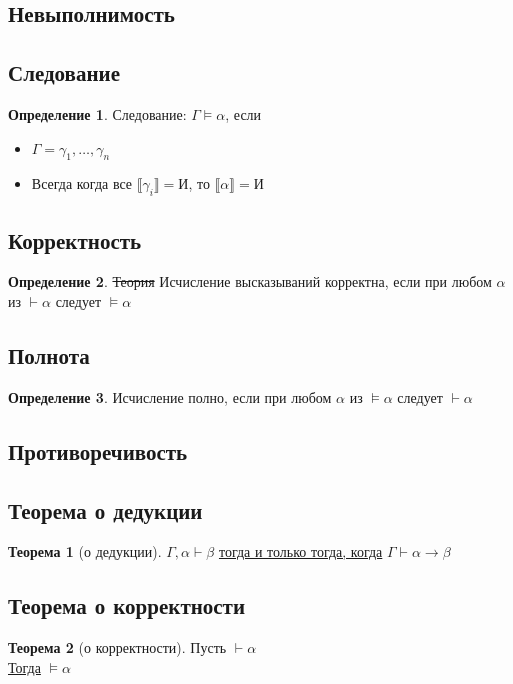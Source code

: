 \documentclass[english]{article}
\newcommand{\llb}{\llbracket}
\newcommand{\rrb}{\rrbracket}
\theoremstyle{plain}
\theoremstyle{remark}
\theoremstyle{definition}
\newtheorem{theorem}{Теорема}[section]
\newtheorem*{definition}{Определение}
\begin{document}
\subsection{Невыполнимость}
\label{sec:org86ad789}
\subsection{Следование}
\label{sec:orgda2d22a}
\begin{definition}
Следование: \(\Gamma \vDash \alpha\), если
\begin{itemize}
\item \(\Gamma = \gamma_1, \dots, \gamma_n\)
\item Всегда когда все \(\llb \gamma_i \rrb = \text{И}\), то \(\llb \alpha \rrb = \text{И}\)
\end{itemize}
\label{org0cebb48}
\end{definition}
\subsection{Корректность}
\label{sec:orgf7c87ea}
\begin{definition}
\sout{Теория} Исчисление высказываний корректна, если при любом \(\alpha\) из \(\vdash \alpha\) следует \(\vDash \alpha\)
\label{orge2f8871}
\end{definition}
\subsection{Полнота}
\label{sec:orgcb2dcf9}
\begin{definition}
Исчисление полно, если при любом \(\alpha\) из \(\vDash \alpha\) следует \(\vdash \alpha\)
\label{org0571872}
\end{definition}
\subsection{Противоречивость}
\label{sec:org6d1f75e}
\subsection{Теорема о дедукции}
\label{sec:org4758fde}
\begin{theorem}[о дедукции]
\(\Gamma, \alpha \vdash \beta\) \uline{тогда и только тогда, когда} \(\Gamma \vdash \alpha \to \beta\)
\label{org206b931}
\end{theorem}
\subsection{Теорема о корректности}
\label{sec:org2415ea6}
\begin{theorem}[о корректности]
Пусть \(\vdash \alpha\) \\
\uline{Тогда} \(\vDash \alpha\)
\label{org505023b}
\end{theorem}
\end{document}
